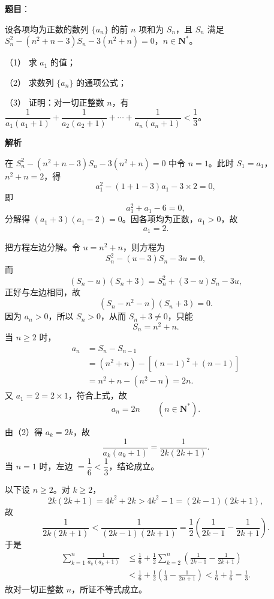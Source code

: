 \begin{answer}

\textbf{题目}：

设各项均为正数的数列 $\{a_n\}$ 的前 $n$ 项和为 $S_n$，且 $S_n$ 满足 $S_n^2-(n^2+n-3)S_n-3(n^2+n)=0$，$n\in\mathbf N^*$。

（1） 求 $a_1$ 的值；

（2） 求数列 $\{a_n\}$ 的通项公式；

（3） 证明：对一切正整数 $n$，有 $\dfrac1{a_1(a_1+1)}+\dfrac1{a_2(a_2+1)}+\cdots+\dfrac1{a_n(a_n+1)}<\dfrac13$。

\textbf{解析}


在 $S_n^2-(n^2+n-3)S_n-3(n^2+n)=0$ 中令 $n=1$。此时 $S_1=a_1$，$n^2+n=2$，得
\nopagebreak[4]
\[a_1^2-(1+1-3)a_1-3\times2=0,\]
即
\nopagebreak[4]
\[a_1^2+a_1-6=0,\]
分解得 $(a_1+3)(a_1-2)=0$。因各项均为正数，$a_1>0$，故
\nopagebreak[4]
\[a_1=2 .\]


把方程左边分解。令 $u=n^2+n$，则方程为
\nopagebreak[4]
\[S_n^2-(u-3)S_n-3u=0,\]
而
\nopagebreak[4]
\[(S_n-u)(S_n+3)=S_n^2+(3-u)S_n-3u,\]
正好与左边相同，故
\nopagebreak[4]
\[(S_n-n^2-n)(S_n+3)=0 .\]
因为 $a_n>0$，所以 $S_n>0$，从而 $S_n+3\neq0$，只能
\nopagebreak[4]
\[S_n=n^2+n .\]
当 $n\geqslant2$ 时，
\nopagebreak[4]
\[\begin{aligned}
a_n&=S_n-S_{n-1}\\
&=(n^2+n)-\left[(n-1)^2+(n-1)\right]\\
&=n^2+n-(n^2-n)=2n .
\end{aligned}\]
又 $a_1=2=2\times1$，符合上式，故
\nopagebreak[4]
\[a_n=2n\qquad(n\in\mathbf N^*).\]


由（2）得 $a_k=2k$，故
\nopagebreak[4]
\[\frac1{a_k(a_k+1)}=\frac1{2k(2k+1)} .\]
当 $n=1$ 时，左边 $=\dfrac16<\dfrac13$，结论成立。

以下设 $n\geqslant2$。对 $k\geqslant2$，
\nopagebreak[4]
\[2k(2k+1)=4k^2+2k>4k^2-1=(2k-1)(2k+1),\]
故
\nopagebreak[4]
\[\frac1{2k(2k+1)}<\frac1{(2k-1)(2k+1)}
=\frac12\left(\frac1{2k-1}-\frac1{2k+1}\right).\]
于是
\nopagebreak[4]
\[\begin{aligned}
\sum_{k=1}^{n}\frac1{a_k(a_k+1)}
&\leqslant\frac16+\frac12\sum_{k=2}^{n}\left(\frac1{2k-1}-\frac1{2k+1}\right)\\
&<\frac16+\frac12\left(\frac13-\frac1{2n+1}\right)
<\frac16+\frac16=\frac13 .
\end{aligned}\]
故对一切正整数 $n$，所证不等式成立。


\end{answer}
